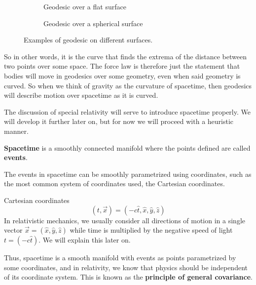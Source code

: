 \documentclass{article}
\begin{document}
 		\begin{figure}[h]
 			\begin{subfigure}{0.46\textwidth}
 				\center
 			\vspace{0.5cm}
 			\caption{Geodesic over a flat surface}
 			\end{subfigure}
 			\begin{subfigure}{0.46\textwidth}
 				\center
 				\caption{Geodesic over a spherical surface}
 			\end{subfigure}
 			\caption{Examples of geodesic on different surfaces.}
 		\end{figure}
 		So in other words, it is the curve that finds the extrema of the distance between two points over some space. The force law is therefore just the statement that bodies will move in geodesics over some geometry, even when said geometry is curved. So when we think of gravity as the curvature of spacetime, then geodesics will describe motion over spacetime as it is curved.
 		
 		The discussion of special relativity will serve to introduce spacetime properly. We will develop it further later on, but for now we will proceed with a heuristic manner. 
 		
 		\begin{defn}
 			\textbf{Spacetime} is a smoothly connected manifold where the points defined are called \textbf{events}.
 		\end{defn}
 		The events in spacetime can be smoothly parametrized using coordinates, such as the most common system of coordinates used, the Cartesian coordinates.
 		\begin{exmp}
 			Cartesian coordinates
 			$$ (t, \vec{x}) = (-c\hat{t}, \hat{x}, \hat{y}, \hat{z})$$
 			In relativistic mechanics, we usually consider all directions of motion in a single vector $\vec{x} = (\hat{x}, \hat{y}, \hat{z})$ while time is multiplied by the negative speed of light $t = (-c\hat{t})$. We will explain this later on.
 		\end{exmp}
 		Thus, spacetime is a smooth manifold with events as points parametrized by some coordinates, and in relativity, we know that physics should be independent of its coordinate system. This is known as the \textbf{principle of general covariance}.
 		
\end{document}
